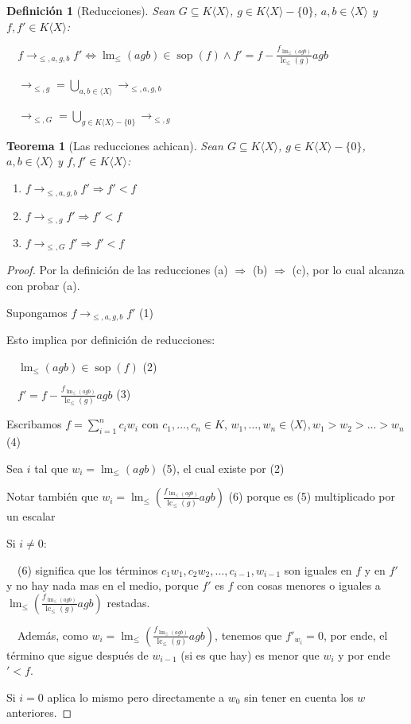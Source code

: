 \documentclass{amsbook}
\theoremstyle{customstyle}
\newtheorem{definition}{Definición}[section]
\newtheorem{theorem}{Teorema}[section]
\DeclareMathOperator{\sop}{sop}
\DeclareMathOperator{\lm}{lm}
\DeclareMathOperator{\lc}{lc}
\begin{document}
\begin{definition}[Reducciones]
Sean $G ⊆ K⟨X⟩$, $g ∈ K⟨X⟩ - \{0\}$, $a, b ∈ ⟨X⟩$ y $f, f' ∈ K⟨X⟩$:

  $f →_{≤, a, g, b} f' ⇔ \lm_≤(agb) ∈ \sop(f) ∧ f' = f - \frac{f_{\lm_≤(agb)}}{\lc_≤(g)}agb$

  $→_{≤, g} = \bigcup_{a, b ∈ ⟨X⟩} →_{≤, a, g, b}$

  $→_{≤, G} = \bigcup_{g ∈ K⟨X⟩ - \{0\}} →_{≤, g}$
\end{definition}

\begin{theorem}[Las reducciones achican]\label{thm:reducciones_achican}
Sean $G ⊆ K⟨X⟩$, $g ∈ K⟨X⟩ - \{0\}$, $a, b ∈ ⟨X⟩$ y $f, f' ∈ K⟨X⟩$:
\begin{enumerate}[label=(\alph*)]
\item $f →_{≤, a, g, b} f' ⇒ f' < f$

\item $f →_{≤, g} f' ⇒ f' < f$

\item $f →_{≤, G} f' ⇒ f' < f$
\end{enumerate}
\end{theorem}
\begin{proof}
Por la definición de las reducciones (a) $⇒$ (b) $⇒$ (c), por lo cual alcanza con probar (a).

Supongamos $f →_{≤, a, g, b} f'$ (1)

Esto implica por definición de reducciones:

  $\lm_≤(agb) ∈ \sop(f)$ (2)

  $f' = f - \frac{f_{\lm_≤(agb)}}{\lc_≤(g)}agb$ (3)

Escribamos $f = \sum_{i = 1}^n c_i w_i$ con $c_1, …, c_n ∈ K$, $w_1, …, w_n ∈ ⟨X⟩, w_1 > w_2 > … > w_n$ (4)

Sea $i$ tal que $w_i = \lm_≤(agb)$ (5), el cual existe por (2)

Notar también que $w_i = \lm_≤(\frac{f_{\lm_≤(agb)}}{\lc_≤(g)}agb)$ (6) porque es (5) multiplicado por un escalar

Si $i ≠ 0$:

  (6) significa que los términos $c_1 w_1, c_2 w_2, …, c_{i-1}, w_{i-1}$ son iguales en $f$ y en $f'$ y no hay nada mas en el medio, porque $f'$ es $f$ con cosas menores o iguales a $\lm_≤(\frac{f_{\lm_≤(agb)}}{\lc_≤(g)}agb)$ restadas.

  Además, como $w_i = \lm_≤(\frac{f_{\lm_≤(agb)}}{\lc_≤(g)}agb)$, tenemos que $f'_{w_i} = 0$, por ende, el término que sigue después de $w_{i-1}$ (si es que hay) es menor que $w_i$ y por ende $' < f$.

Si $i = 0$ aplica lo mismo pero directamente a $w_0$ sin tener en cuenta los $w$ anteriores.

\end{proof}
\end{document}
